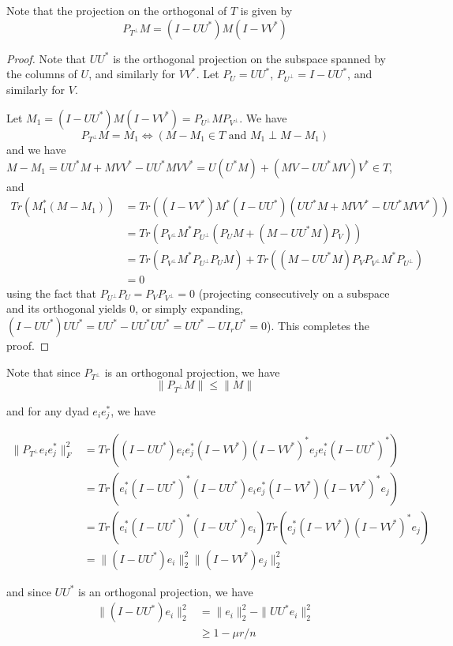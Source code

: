 Note that the projection on the orthogonal of $T$ is given by
\begin{equation}
P_{T^\perp} M = (I - UU^*)M(I - VV^*) \label{property: p1}
\end{equation}

\begin{proof}
Note that $UU^*$ is the orthogonal projection on the subspace spanned by the columns of $U$, and similarly for $VV^*$. Let $P_U = UU^*$, $P_{U^\perp} = I - UU^*$, and similarly for $V$.

Let $M_1 = (I - UU^*)M(I - VV^*) = P_{U^\perp} M P_{V^\perp}$. We have
\[
P_{T^\perp} M = M_1 \Leftrightarrow (M - M_1 \in T \text{ and } M_1 \perp M - M_1)
\]
and we have $M - M_1 = UU^*M + MVV^* - UU^*MVV^* = U(U^*M) + (MV - UU^*MV)V^* \in T$, and
\begin{align*}
Tr(M_1^* (M - M_1))
&= Tr((I-VV^*)M^*(I-UU^*)(UU^*M + MVV^* - UU^*MVV^*)) \\
&= Tr(P_{V^\perp}M^*P_{U^\perp}(P_UM + (M - UU^*M)P_V)) \\
&= Tr(P_{V^\perp}M^*P_{U^\perp}P_UM) + Tr((M - UU^*M)P_VP_{V^\perp}M^*P_{U^\perp})\\
&=0
\end{align*}
using the fact that $P_{U^\perp}P_U = P_V P_{V^\perp} = 0$ (projecting consecutively on a subspace and its orthogonal yields 0, or simply expanding, $(I-UU^*)UU^* = UU^* - UU^*UU^* = UU^* - U I_r U^* = 0$). This completes the proof.
\end{proof}

Note that since $P_{T^\perp}$ is an orthogonal projection, we have
\begin{equation}
\| P_{T^\perp} M \| \leq \|M\| \label{property: p2}
\end{equation}

and for any dyad $e_i e_j^*$, we have

\begin{align*}
\|P_{T^\perp} e_ie_j^*\|_F^2
&= Tr\left( (I-UU^*)e_ie_j^*(I-VV^*)(I-VV^*)^*e_je_i^*(I-UU^*)^* \right) \\
&= Tr\left( e_i^*(I-UU^*)^*(I-UU^*)e_ie_j^*(I-VV^*)(I-VV^*)^*e_j \right) \\
&= Tr\left( e_i^*(I-UU^*)^*(I-UU^*)e_i\right) Tr \left(e_j^*(I-VV^*)(I-VV^*)^*e_j \right) \\
&= \|(I - UU^*)e_i\|_2^2 \|(I - VV^*)e_j\|_2^2
\end{align*}

and since $UU^*$ is an orthogonal projection, we have
\begin{align*}
\|(I - UU^*)e_i\|_2^2
&= \|e_i\|_2^2 - \|UU^*e_i\|_2^2 \\
&\geq 1 - \mu r / n
\end{align*}

